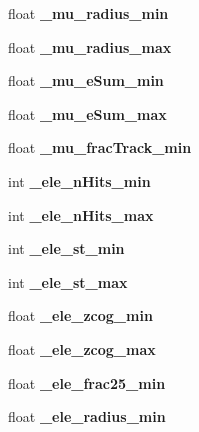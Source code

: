 \begin{DoxyCompactItemize}
\item 
float {\bfseries \-\_\-mu\-\_\-radius\-\_\-min}\label{classCALICE_1_1TBParticleID_a2f230b341175de64d97edd1883416ac4}

\item 
float {\bfseries \-\_\-mu\-\_\-radius\-\_\-max}\label{classCALICE_1_1TBParticleID_aa26b82ccf42ba3dcf0bec687a3d10e1e}

\item 
float {\bfseries \-\_\-mu\-\_\-e\-Sum\-\_\-min}\label{classCALICE_1_1TBParticleID_a85240822913dd38a4874b278b54a4515}

\item 
float {\bfseries \-\_\-mu\-\_\-e\-Sum\-\_\-max}\label{classCALICE_1_1TBParticleID_a14bf378a3049faaa128411d7ca4909cd}

\item 
float {\bfseries \-\_\-mu\-\_\-frac\-Track\-\_\-min}\label{classCALICE_1_1TBParticleID_aba41d284ba4ba74a66457905bbab9cf7}

\item 
int {\bfseries \-\_\-ele\-\_\-n\-Hits\-\_\-min}\label{classCALICE_1_1TBParticleID_a133152274f10743cf372c2a14367bb60}

\item 
int {\bfseries \-\_\-ele\-\_\-n\-Hits\-\_\-max}\label{classCALICE_1_1TBParticleID_a35669f94a5e3f03b3b877e37266ef98b}

\item 
int {\bfseries \-\_\-ele\-\_\-st\-\_\-min}\label{classCALICE_1_1TBParticleID_a9dd72f623cc17840248cf356219d24d1}

\item 
int {\bfseries \-\_\-ele\-\_\-st\-\_\-max}\label{classCALICE_1_1TBParticleID_a005faf75adde4f2e783d8c65cc2f6d6e}

\item 
float {\bfseries \-\_\-ele\-\_\-zcog\-\_\-min}\label{classCALICE_1_1TBParticleID_ab1613c7c91f41341cc1419eee978b8fa}

\item 
float {\bfseries \-\_\-ele\-\_\-zcog\-\_\-max}\label{classCALICE_1_1TBParticleID_a162922d980682e8436614a644c8fb021}

\item 
float {\bfseries \-\_\-ele\-\_\-frac25\-\_\-min}\label{classCALICE_1_1TBParticleID_a79d442a79ec0774526c091ac32ca25aa}

\item 
float {\bfseries \-\_\-ele\-\_\-radius\-\_\-min}\label{classCALICE_1_1TBParticleID_ab9f12845258335be4e39820a7bd55b5f}


\end{DoxyCompactItemize}
